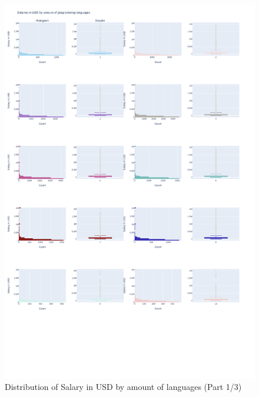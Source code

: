 \documentclass{article}
\begin{document}
\begin{figure}[ht]
    \centering
    \includegraphics[width=\textwidth]{images/salary_amount_1.pdf}
    \caption{Distribution of Salary in USD by amount of languages (Part 1/3)}
    \label{fig:salarybylang1}
\end{figure}
\end{document}
